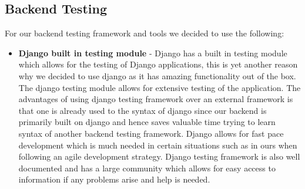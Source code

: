 \documentclass[12pt]{article}
\begin{document}
\subsection{Backend Testing}
For our backend testing framework and tools we decided to use the following:
\begin{itemize}
    \item \textbf{Django built in testing module} - Django has a built in testing module which allows for the testing of Django applications, this is yet another reason why we decided to use django as it has amazing functionality out of the box. The django testing module allows for extensive testing of the application. The advantages of using django testing framework over an external framework is that one is already used to the syntax of django since our backend is primarily built on django and hence saves valuable time trying to learn syntax of another backend testing framework. Django allows for fast pace development which is much needed in certain situations such as in ours when following an agile development strategy. Django testing framework is also well documented and has a large community which allows for easy access to information if any problems arise and help is needed.
\end{itemize}
\end{document}
